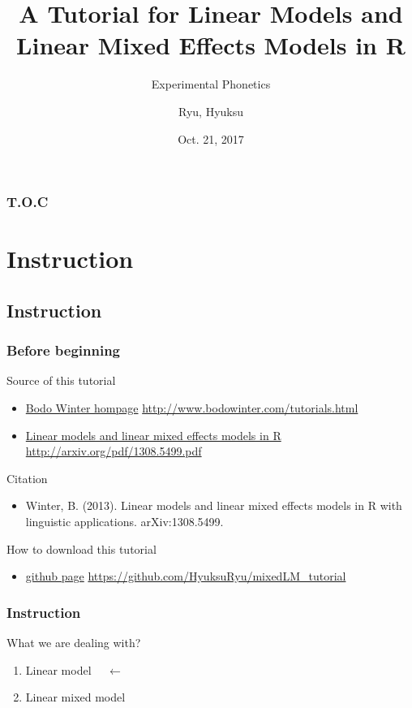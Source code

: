 \documentclass[10p]{beamer}\usepackage[]{graphicx}\usepackage[]{color}
\author{Ryu, Hyuksu}
\institute{Naver Clova}
\title{A Tutorial for Linear Models and Linear Mixed Effects Models in R}
\subtitle{Experimental Phonetics}
\date{Oct. 21, 2017}
\begin{document}
\begin{frame}
\maketitle
\end{frame}

\begin{frame}
\frametitle{T.O.C}
	\tableofcontents[subsectionstyle=hide]
\end{frame}

\section{Instruction}
\subsection{Instruction}

\begin{frame}
\frametitle{Before beginning}
Source of this tutorial
\begin{itemize}
  \item \href{http://www.bodowinter.com/tutorials.html}{Bodo Winter hompage} 
  \url{http://www.bodowinter.com/tutorials.html}
  \item \href{http://arxiv.org/pdf/1308.5499.pdf}{Linear models and linear mixed effects models in R}
  \url{http://arxiv.org/pdf/1308.5499.pdf}
\end{itemize}
\vspace{9pt}
Citation
\begin{itemize}
  \item Winter, B. (2013). Linear models and linear mixed effects models in R with linguistic applications. arXiv:1308.5499. 
\end{itemize}

\vspace{9pt}
How to download this tutorial
\begin{itemize}
  \item \href{https://github.com/HyuksuRyu/mixedLM_tutorial}{github page} \url{https://github.com/HyuksuRyu/mixedLM_tutorial}
\end{itemize}
\end{frame}


\begin{frame}
\frametitle{Instruction}
What we are dealing with?
\begin{enumerate}
\item \alert{Linear model} $\quad \leftarrow$
\item Linear mixed model
\end{enumerate}
\end{frame}
\end{document}
